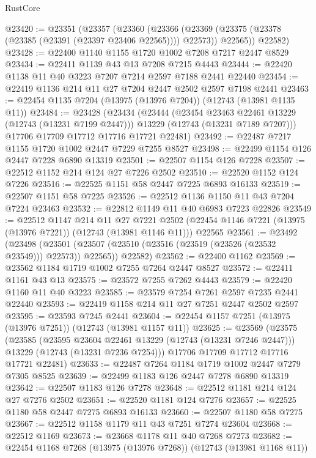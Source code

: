 \begin{lexlean}{RustCore}
\begin{coremodule}
@23420 := @23351
    (@23357
      (@23360
        (@23366 (@23369 (@23375 (@23378 (@23385 (@23391 (@23397 @23406 @22565)))) @22573)) @22565))
      @22582)
@23428 := @22400 @1140 @1155 @1720 @1002 @7208 @7217 @2447 @8529
@23434 := @22411 @1139 @43 @13 @7208 @7215 @4443
@23444 := @22420 @1138 @11 @40 @3223 @7207 @7214 @2597 @7188 @2441 @22440
@23454 := @22419 @1136 @214 @11 @27 @7204 @2447 @2502 @2597 @7198 @2441
@23463 := @22454 @1135 @7204 (@13975 (@13976 @7204)) (@12743 (@13981 @1135 @11))
@23484 := @23428
    (@23434
      (@23444
        (@23454 @23463 @22461 @13229 (@12743 (@13231 @7199 @2447)))
        @13229
        (@12743 (@13231 @7189 @7207)))
      @17706
      @17709
      @17712
      @17716
      @17721
      @22481)
@23492 := @22487 @7217 @1155 @1720 @1002 @2447 @7229 @7255 @8527
@23498 := @22499 @1154 @126 @2447 @7228 @6890 @13319
@23501 := @22507 @1154 @126 @7228
@23507 := @22512 @1152 @214 @124 @27 @7226 @2502
@23510 := @22520 @1152 @124 @7226
@23516 := @22525 @1151 @58 @2447 @7225 @6893 @16133
@23519 := @22507 @1151 @58 @7225
@23526 := @22512 @1136 @1150 @11 @43 @7204 @7224 @23463
@23532 := @22812 @1149 @11 @40 @6983 @7223 @22826
@23549 := @22512
    @1147
    @214
    @11
    @27
    @7221
    @2502
    (@22454 @1146 @7221 (@13975 (@13976 @7221)) (@12743 (@13981 @1146 @11)))
    @22565
@23561 := @23492
    (@23498
      (@23501 (@23507 (@23510 (@23516 (@23519 (@23526 (@23532 @23549))) @22573)) @22565))
      @22582)
@23562 := @22400 @1162
@23569 := @23562 @1184 @1719 @1002 @7255 @7264 @2447 @8527
@23572 := @22411 @1161 @43 @13
@23575 := @23572 @7255 @7262 @4443
@23579 := @22420 @1160 @11 @40 @3223
@23585 := @23579 @7254 @7261 @2597 @7235 @2441 @22440
@23593 := @22419 @1158 @214 @11 @27 @7251 @2447 @2502 @2597
@23595 := @23593 @7245 @2441
@23604 := @22454 @1157 @7251 (@13975 (@13976 @7251)) (@12743 (@13981 @1157 @11))
@23625 := @23569
    (@23575
      (@23585
        (@23595 @23604 @22461 @13229 (@12743 (@13231 @7246 @2447)))
        @13229
        (@12743 (@13231 @7236 @7254)))
      @17706
      @17709
      @17712
      @17716
      @17721
      @22481)
@23633 := @22487 @7264 @1184 @1719 @1002 @2447 @7279 @7305 @8525
@23639 := @22499 @1183 @126 @2447 @7278 @6890 @13319
@23642 := @22507 @1183 @126 @7278
@23648 := @22512 @1181 @214 @124 @27 @7276 @2502
@23651 := @22520 @1181 @124 @7276
@23657 := @22525 @1180 @58 @2447 @7275 @6893 @16133
@23660 := @22507 @1180 @58 @7275
@23667 := @22512 @1158 @1179 @11 @43 @7251 @7274 @23604
@23668 := @22512 @1169
@23673 := @23668 @1178 @11 @40 @7268 @7273
@23682 := @22454 @1168 @7268 (@13975 (@13976 @7268)) (@12743 (@13981 @1168 @11))

\end{coremodule}
\end{lexlean}
